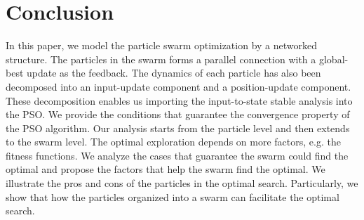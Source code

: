 \section{Conclusion}
\label{sec:conclusion}

In this paper, we model the particle swarm optimization by a networked structure.
The particles in the swarm forms a parallel connection with a global-best update as the feedback.
The dynamics of each particle has also been decomposed into an input-update component and a position-update component.
These decomposition enables us importing the input-to-state stable analysis into the PSO.
We provide the conditions that guarantee the convergence property of the PSO algorithm.
Our analysis starts from the particle level and then extends to the swarm level.
The optimal exploration depends on more factors, e.g. the fitness functions.
We analyze the cases that guarantee the swarm could find the optimal and propose the factors that help the swarm find the optimal.
We illustrate the pros and cons of the particles in the optimal search. 
Particularly, we show that how the particles organized into a swarm can facilitate the optimal search.
